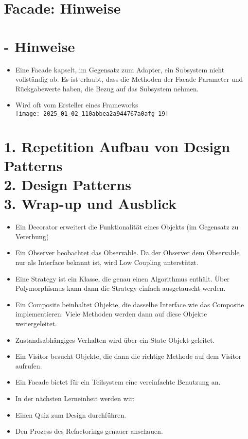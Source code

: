 \documentclass[10pt]{article}
\begin{document}
\section*{Facade: Hinweise}
\section*{- Hinweise}
\begin{itemize}
  \item Eine Facade kapselt, im Gegensatz zum Adapter, ein Subsystem nicht vollständig ab. Es ist erlaubt, dass die Methoden der Facade Parameter und Rückgabewerte haben, die Bezug auf das Subsystem nehmen.
  \item Wird oft vom Ersteller eines Frameworks\\
\texttt{[image: 2025\_01\_02\_110abbea2a944767a0afg-19]}
\end{itemize}

\section*{1. Repetition Aufbau von Design Patterns \\
 2. Design Patterns \\
 3. Wrap-up und Ausblick }
\begin{itemize}
  \item Ein Decorator erweitert die Funktionalität eines Objekts (im Gegensatz zu Vererbung)
  \item Ein Observer beobachtet das Observable. Da der Observer dem Observable nur als Interface bekannt ist, wird Low Coupling unterstützt.
  \item Eine Strategy ist ein Klasse, die genau einen Algorithmus enthält. Über Polymorphismus kann dann die Strategy einfach ausgetauscht werden.
  \item Ein Composite beinhaltet Objekte, die dasselbe Interface wie das Composite implementieren. Viele Methoden werden dann auf diese Objekte weitergeleitet.
  \item Zustandsabhängiges Verhalten wird über ein State Objekt geleitet.
  \item Ein Visitor besucht Objekte, die dann die richtige Methode auf dem Visitor aufrufen.
  \item Ein Facade bietet für ein Teilsystem eine vereinfachte Benutzung an.
  \item In der nächsten Lerneinheit werden wir:
  \item Einen Quiz zum Design durchführen.
  \item Den Prozess des Refactorings genauer anschauen.
\end{itemize}
\end{document}
